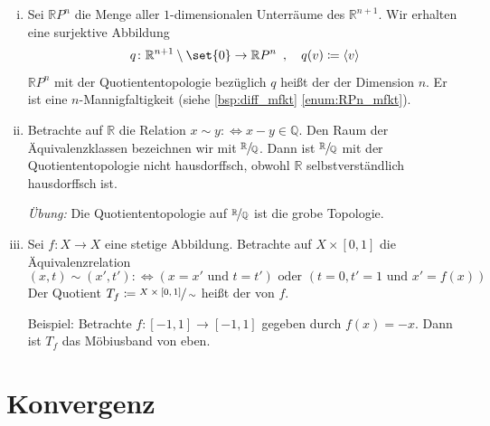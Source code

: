\begin{beispiel}[{name=[Räume konstruiert als Quotienten]},label=bsp:konst-top]
\begin{enumerate}[(i)]
\begin{figure}[hbt]
			\caption[Möbius-Band]{Möbius-Band, }\label{fig:moebius}
		\end{figure}
		\item Sei $\mathbb{R}P^n$ die Menge aller $1$-dimensionalen Unterräume des $\mathbb{R}^{n+1}$.
		Wir erhalten eine surjektive Abbildung
		\[
			q \colon \mathbb{R}^{n+1}\setminus \set{0} \to \mathbb{R}P^n \enspace,  \quad  q(v) \coloneqq \langle v\rangle
		\]
		$\mathbb{R}P^n$ mit der Quotiententopologie bezüglich $q$ heißt der  der Dimension $n$. Er ist eine $n$-Mannigfaltigkeit (siehe \cref{bsp:diff_mfkt} \cref{enum:RPn_mfkt}).
		\item Betrachte auf $\mathbb{R}$ die Relation $x \sim y :\Leftrightarrow x-y \in \mathbb{Q}$.
		Den Raum der Äquivalenzklassen bezeichnen wir mit $\sfrac{\mathbb{R}}{\mathbb{Q}}$.
		Dann ist $\sfrac{\mathbb{R}}{\mathbb{Q}}$ mit der Quotiententopologie nicht hausdorffsch, obwohl $\mathbb{R}$ selbstverständlich hausdorffsch ist.

		\emph{Übung:} Die Quotiententopologie auf $\nicefrac{\mathbb{R}}{\mathbb{Q}}$ ist die grobe Topologie.
		\item\label{bsp:konst-top:enum:5} Sei $f \colon X \to X$ eine stetige Abbildung.
		Betrachte auf $X \times [0,1]$ die Äquivalenzrelation
		\[
			(x,t) \sim (x',t') : \Longleftrightarrow (x=x' \text{ und } t=t') \text{ oder } (t=0, t'=1 \text{ und } x'= f(x))
		\]
		Der Quotient $T_f \coloneqq \sfrac{X \times [0,1]}{\sim}$ heißt der  von $f$.

		Beispiel: Betrachte $f \colon [{-1,1}] \to [{-1,1}]$ gegeben durch $f(x)=-x$.
		Dann ist $T_f$ das Möbiusband von eben.
	\end{enumerate}
\end{beispiel}

\newpage

\section{Konvergenz} %
\label{sec:konvergenz}

